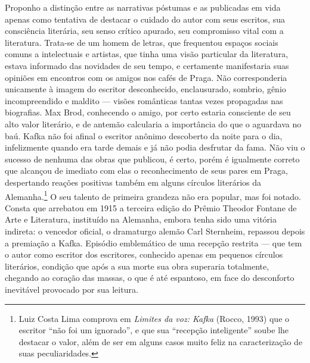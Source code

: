 Proponho a distinção entre as narrativas póstumas e as publicadas em
vida apenas como tentativa de destacar o cuidado do autor com seus
escritos, sua consciência literária, seu senso crítico apurado, seu
compromisso vital com a literatura. Trata-se de um homem de letras,
que frequentou espaços sociais comuns a intelectuais e artistas, que
tinha uma visão particular da literatura, estava informado das
novidades de seu tempo, e certamente manifestaria suas opiniões em
encontros com os amigos nos cafés de Praga. Não corresponderia
unicamente à imagem do escritor desconhecido, enclausurado, sombrio,
gênio incompreendido e maldito --- visões românticas tantas vezes
propagadas nas biografias. Max Brod, conhecendo o amigo, por certo
estaria consciente de seu alto valor literário, e de antemão calcularia
a importância do que o aguardava no baú. Kafka não foi afinal o
escritor anônimo descoberto da noite para o dia, infelizmente quando
era tarde demais e já não podia desfrutar da fama. Não viu o sucesso de
nenhuma das obras que publicou, é certo, porém é igualmente correto que
alcançou de imediato com elas o reconhecimento de seus pares em Praga,
despertando reações positivas também em alguns círculos literários da
Alemanha.\footnote{ Luiz Costa Lima comprova em \textit{Limites da voz:
Kafka} (Rocco, 1993) que o escritor “não foi um
ignorado”, e que sua “recepção inteligente” soube lhe destacar o valor,
além de ser em alguns casos muito feliz na caracterização de suas
peculiaridades.} O seu talento de primeira grandeza não era popular, mas
foi notado. Consta que arrebatou em 1915 a terceira edição do Prêmio
Theodor Fontane de Arte e Literatura, instituído na Alemanha, embora
tenha sido uma vitória indireta: o vencedor oficial, o dramaturgo
alemão Carl Sternheim, repassou depois a premiação a Kafka. Episódio
emblemático de uma recepção restrita --- que tem o autor como escritor dos
escritores, conhecido apenas em pequenos círculos literários, condição
que após a sua morte sua obra superaria totalmente, chegando ao coração
das massas, o que é até espantoso, em face do desconforto inevitável
provocado por sua leitura.

